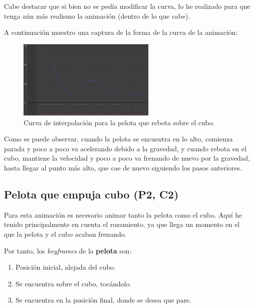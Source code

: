 \documentclass{article}
\begin{document}
Cabe destacar que si bien no se pedía modificar la curva, lo he realizado para que tenga aún más realismo la animación (dentro de lo que cabe). 

\newpage

A continuación muestro una captura de la forma de la curva de la animación:


\begin{figure}[H]
    \centering
    \includegraphics[width=0.6\textwidth]{imagenes/Ejercicio 1/curva_p1.png}
    \caption{Curva de interpolación para la pelota que rebota sobre el cubo.}
\end{figure}


Como se puede observar, cuando la pelota se encuentra en lo alto, comienza parada y poco a poco va acelerando debido a la gravedad, y cuando rebota en el cubo, mantiene la velocidad y poco a poco va frenando de nuevo por la gravedad, hasta llegar al punto más alto, que cae de nuevo siguiendo los pasos anteriores.

\subsection{Pelota que empuja cubo (P2, C2)}

Para esta animación es necesario animar tanto la pelota como el cubo. Aquí he tenido principalmente en cuenta el rozamiento, ya que llega un momento en el que la pelota y el cubo acaban frenando.

\bigskip

Por tanto, los \textit{keyframes} de la \textbf{pelota} son:

\begin{enumerate}
    \item Posición inicial, alejada del cubo.
    \item Se encuentra sobre el cubo, tocándolo.
    \item Se encuentra en la posición final, donde se desea que pare.
\end{enumerate}

\bigskip
\end{document}
